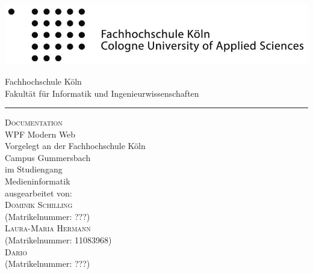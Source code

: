 \documentclass[a4paper,12pt,oneside]{article} %
\begin{document}
 
   
  \pagestyle{empty}
  
  
  \begin{titlepage}
    \includegraphics[scale=1.00]{Sources/logo_fhkoeln_sw}\\
    \begin{center}
      \Large
      Fachhochschule Köln\\
      Fakultät für Informatik und Ingenieurwissenschaften\\
      \hrule\par\rule{0pt}{2cm} %
      \LARGE
      \textsc{Documentation}\\
      \vspace{1cm} %
      \huge
      WPF Modern Web\\
      \Large
      \vspace{1.5cm}
      \large
      Vorgelegt an der Fachhochschule Köln\\
      Campus Gummersbach\\
      im Studiengang\\
      Medieninformatik\\ 
      \vspace{1.0cm}
      ausgearbeitet von:\\
      \textsc{Dominik Schilling}\\
      (Matrikelnummer: ???)\\
      \textsc{Laura-Maria Hermann}\\
      (Matrikelnummer: 11083968)\\
      \textsc{Dario }\\
      (Matrikelnummer: ???)\\
      \vspace{1.5cm}
      \vspace{1.5cm}
     
    \end{center}    
  \end{titlepage}
  
  \newpage
 
\end{document}
